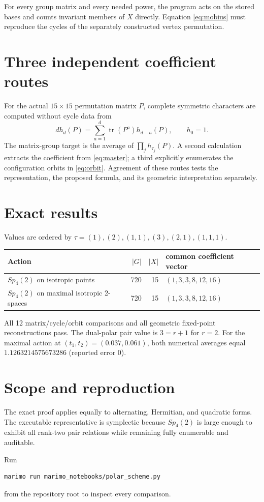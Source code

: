 \documentclass[11pt]{article}
\begin{document}
For every group matrix and every needed power, the program acts on the stored
bases and counts invariant members of $X$ directly.  Equation
\eqref{eq:mobius} must reproduce the cycles of the separately constructed
vertex permutation.

\section{Three independent coefficient routes}
For the actual $15\times15$ permutation matrix $P$, complete symmetric
characters are computed without cycle data from
\[
d h_d(P)=\sum_{a=1}^d\operatorname{tr}(P^a)h_{d-a}(P),\qquad h_0=1.
\]
The matrix-group target is the average of $\prod_jh_{\tau_j}(P)$.  A second
calculation extracts the coefficient from \eqref{eq:master}; a third explicitly
enumerates the configuration orbits in \eqref{eq:orbit}.  Agreement of these
routes tests the representation, the proposed formula, and its geometric
interpretation separately.

\section{Exact results}
Values are ordered by
$\tau=(1),(2),(1,1),(3),(2,1),(1,1,1)$.
\begin{center}
\begin{tabular}{@{}lrrl@{}}
\toprule
Action & $|G|$ & $|X|$ & common coefficient vector\\
\midrule
$Sp_4(2)$ on isotropic points & 720 & 15 & $(1,3,3,8,12,16)$\\
$Sp_4(2)$ on maximal isotropic 2-spaces & 720 & 15 & $(1,3,3,8,12,16)$\\
\bottomrule
\end{tabular}
\end{center}
All 12 matrix/cycle/orbit comparisons and all geometric fixed-point
reconstructions pass.  The dual-polar pair value is $3=r+1$ for $r=2$.  For
the maximal action at $(t_1,t_2)=(0.037,0.061)$, both numerical averages equal
$1.1263214575673286$ (reported error $0$).

\section{Scope and reproduction}
The exact proof applies equally to alternating, Hermitian, and quadratic
forms.  The executable representative is symplectic because $Sp_4(2)$ is
large enough to exhibit all rank-two pair relations while remaining fully
enumerable and auditable.

Run
\begin{verbatim}
marimo run marimo_notebooks/polar_scheme.py
\end{verbatim}
from the repository root to inspect every comparison.
\end{document}
